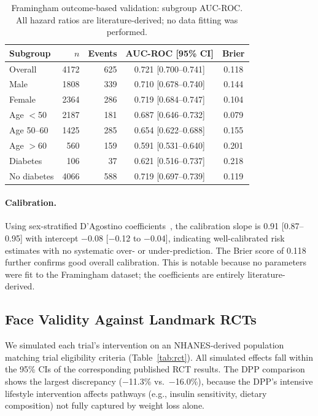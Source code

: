 \documentclass[runningheads]{llncs}
\begin{document}
\begin{table}[t]
\centering
\caption{Framingham outcome-based validation: subgroup AUC-ROC.
All hazard ratios are literature-derived; no data fitting was performed.}
\label{tab:framingham_sub}
\small
\begin{tabular}{@{}lrrcc@{}}
\toprule
\textbf{Subgroup} & \textbf{$n$} & \textbf{Events} & \textbf{AUC-ROC [95\% CI]} & \textbf{Brier} \\
\midrule
Overall     & 4172 & 625 & 0.721 [0.700--0.741] & 0.118 \\
Male        & 1808 & 339 & 0.710 [0.678--0.740] & 0.144 \\
Female      & 2364 & 286 & 0.719 [0.684--0.747] & 0.104 \\
Age ${<}$50 & 2187 & 181 & 0.687 [0.646--0.732] & 0.079 \\
Age 50--60  & 1425 & 285 & 0.654 [0.622--0.688] & 0.155 \\
Age ${>}$60 &  560 & 159 & 0.591 [0.531--0.640] & 0.201 \\
Diabetes    &  106 &  37 & 0.621 [0.516--0.737] & 0.218 \\
No diabetes & 4066 & 588 & 0.719 [0.697--0.739] & 0.119 \\
\bottomrule
\end{tabular}
\end{table}

\paragraph{Calibration.}
Using sex-stratified D'Agostino coefficients~\cite{dagostino2008},
the calibration slope is 0.91 [0.87--0.95] with intercept $-$0.08
[$-$0.12 to $-$0.04], indicating well-calibrated risk estimates
with no systematic over- or under-prediction.  The Brier score of
0.118 further confirms good overall calibration.  This is notable
because no parameters were fit to the Framingham dataset; the
coefficients are entirely literature-derived.

\subsection{Face Validity Against Landmark RCTs}\label{sec:faceval}

We simulated each trial's intervention on an NHANES-derived population
matching trial eligibility criteria (Table~\ref{tab:rct}).  All
simulated effects fall within the 95\% CIs of the corresponding
published RCT results.  The DPP comparison shows the largest
discrepancy ($-$11.3\% vs.\ $-$16.0\%), because the DPP's intensive
lifestyle intervention affects pathways (e.g., insulin sensitivity,
dietary composition) not fully captured by weight loss alone.
\end{document}
